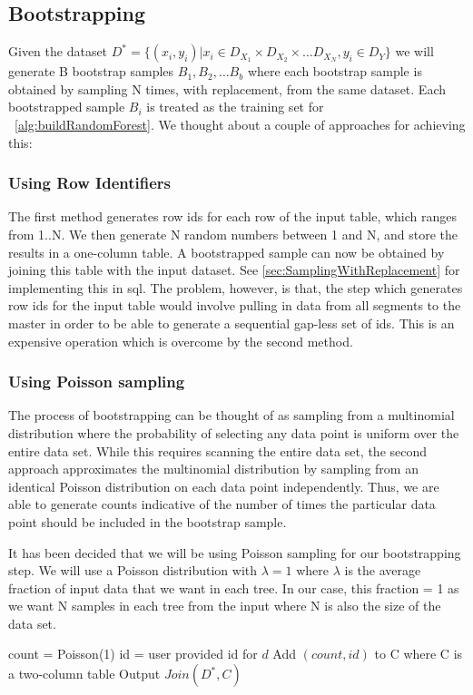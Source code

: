 \subsection{Bootstrapping}
Given the dataset $D^* = \{(x_i, y_i) | x_i \in D_{X_1} \times D_{X_2} \times \dots D_{X_N}, y_i \in D_Y\}$
we will generate B bootstrap samples $B_{1}, B_{2}, \dots B_{b}$ where each bootstrap
sample is obtained by sampling N times, with replacement, from the same dataset.
Each bootstrapped sample $B_{i}$ is treated as the training set for ~\ref{alg:buildRandomForest}.
We thought about a couple of approaches for achieving this:

\subsubsection{Using Row Identifiers}
The first method generates row ids for each row of the input table, which ranges from 
  1..N. We then generate N random numbers between 1 and N, and store the results in a 
  one-column table. A bootstrapped sample can now be obtained by joining this
  table with the input dataset. See \ref{sec:SamplingWithReplacement} for implementing this
  in sql. The problem, however, is that, the step which generates row ids for the input table 
  would involve pulling in data from all segments to the master in order to be able to generate 
  a sequential gap-less set of ids. This is an expensive operation which is overcome by the 
  second method.
  
\subsubsection{Using Poisson sampling}
The process of bootstrapping can be thought of as sampling from a multinomial 
  distribution where the probability of selecting any data point is uniform
  over the entire data set. While this requires scanning the entire data set, the second 
  approach approximates the multinomial distribution by sampling from an identical 
  Poisson distribution on each data point independently. Thus, we are able to generate
  counts indicative of the number of times the particular data point should 
  be included in the bootstrap sample.

It has been decided that we will be using Poisson sampling for our bootstrapping step.
We will use a Poisson distribution with $\lambda=1$ where $\lambda$ is the average
fraction of input data that we want in each tree. In our case, this fraction = 1 as we want 
N samples in each tree from the input where N is also the size of the data set.
\\
\begin{algorithm}[Bootstrapping$(D^*)$]\label{alg:bootstrap}
  \begin{algorithmic}[1]
     \State count = Poisson(1)
     \State id = user provided id for $d$
     \State Add $(count, id)$ to C where C is a two-column table
    \EndFor
    \State Output $Join(D^*,C)$   
  \end{algorithmic}
\end{algorithm}

